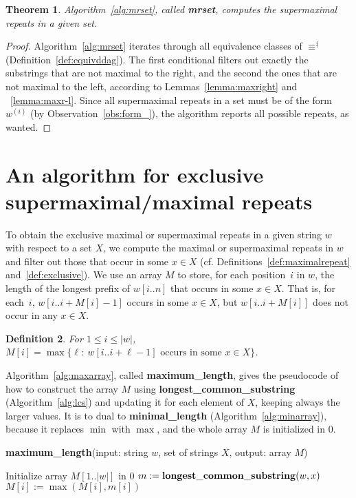 \documentclass[submission]{dmtcs}
\newcommand\+[1]{\mathcal{#1}}
\newtheorem{theorem}{Theorem}
\newtheorem{definition}[theorem]{Definition}
\begin{document}
\begin{theorem}
Algorithm~\ref{alg:mrset}, called {\bf mrset}, computes the supermaximal
repeats in a given set.
\end{theorem}
\begin{proof}
Algorithm~\ref{alg:mrset}
iterates through all equivalence classes of $\equiv^{\ddag}$
(Definition~\ref{def:equivddag}).
The first conditional filters out exactly the substrings that are not maximal
to the right, and the second  the ones that are not maximal to the left,
according to Lemmas~\ref{lemma:maxright} and ~\ref{lemma:maxr-l}.
Since all supermaximal repeats in a set must be of the form $w^{(i)}$ (by
Observation~\ref{obs:form_}), the algorithm reports all possible
repeats, as wanted.
\end{proof}




\section{An algorithm for exclusive supermaximal/maximal repeats}


To obtain the exclusive maximal or supermaximal repeats in a given string $w$ 
with respect to a set $X$, we compute the maximal or supermaximal repeats
in $w$ 
and filter out those that occur in some $x\in X$
(cf. Definitions~\ref{def:maximalrepeat} and~\ref{def:exclusive}).
We use an array $M$ to store, for each position~$i$ in $w$, 
the length of the longest prefix of $w[i..n]$ that occurs in some $x\in X$. 
That is, for each~$i$, $w[i..i+M[i]-1]$ 
occurs in some $x\in X$, but $w[i..i+M[i]]$ does not occur in any $x\in X$.

\begin{definition} \label{def:M}
For $1\leq i \leq |w|$,
$M[i]=\max\{\ell :  \  w[i..i+\ell-1] \text{ occurs in some } x\in X\}$.
\end{definition}

Algorithm~\ref{alg:maxarray}, called {\bf maximum\_length}, 
gives the pseudocode of
how to construct the array $M$ using 
{\bf longest\_common\_substring} (Algorithm~\ref{alg:lcs})
and updating it for each 
element of $X$, keeping always the larger values.
It is to dual to {\bf minimal\_length} (Algorithm~\ref{alg:minarray}),
because it replaces $\min$ with $\max$, and the whole array $M$
is initialized in $0$.

\begin{algorithm}[th]
\caption{{\bf maximum\_length}(input: string $w$, set of strings $X$,  output:
array $M$)\label{alg:maxarray}}
\begin{algorithmic}
\STATE
\STATE  Initialize array $M[1..|w|]$  in $0$ 
	\STATE $m := {\bf longest\_common\_substring}(w,x)$
		\STATE $M[i] := \max(M[i],m[i])$
	\ENDFOR
\ENDFOR
\STATE
\end{algorithmic}
\end{algorithm}
\end{document}
